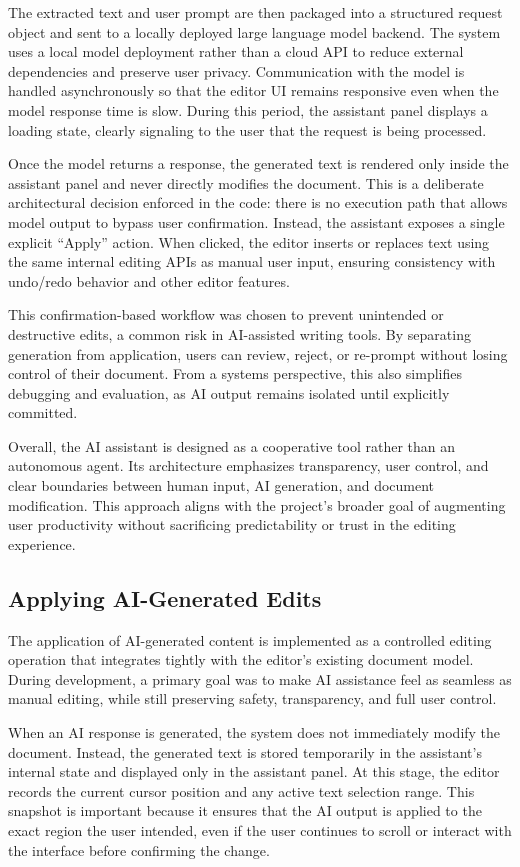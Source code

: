 \documentclass[sigconf]{acmart}
\begin{document}
The extracted text and user prompt are then packaged into a structured request object and sent to a locally deployed large language model backend. The system uses a local model deployment rather than a cloud API to reduce external dependencies and preserve user privacy. Communication with the model is handled asynchronously so that the editor UI remains responsive even when the model response time is slow. During this period, the assistant panel displays a loading state, clearly signaling to the user that the request is being processed.

Once the model returns a response, the generated text is rendered only inside the assistant panel and never directly modifies the document. This is a deliberate architectural decision enforced in the code: there is no execution path that allows model output to bypass user confirmation. Instead, the assistant exposes a single explicit “Apply” action. When clicked, the editor inserts or replaces text using the same internal editing APIs as manual user input, ensuring consistency with undo/redo behavior and other editor features.

This confirmation-based workflow was chosen to prevent unintended or destructive edits, a common risk in AI-assisted writing tools. By separating generation from application, users can review, reject, or re-prompt without losing control of their document. From a systems perspective, this also simplifies debugging and evaluation, as AI output remains isolated until explicitly committed.

Overall, the AI assistant is designed as a cooperative tool rather than an autonomous agent. Its architecture emphasizes transparency, user control, and clear boundaries between human input, AI generation, and document modification. This approach aligns with the project’s broader goal of augmenting user productivity without sacrificing predictability or trust in the editing experience.

\subsection{Applying AI-Generated Edits}
The application of AI-generated content is implemented as a controlled editing operation that integrates tightly with the editor’s existing document model. During development, a primary goal was to make AI assistance feel as seamless as manual editing, while still preserving safety, transparency, and full user control.

When an AI response is generated, the system does not immediately modify the document. Instead, the generated text is stored temporarily in the assistant’s internal state and displayed only in the assistant panel. At this stage, the editor records the current cursor position and any active text selection range. This snapshot is important because it ensures that the AI output is applied to the exact region the user intended, even if the user continues to scroll or interact with the interface before confirming the change.
\end{document}
